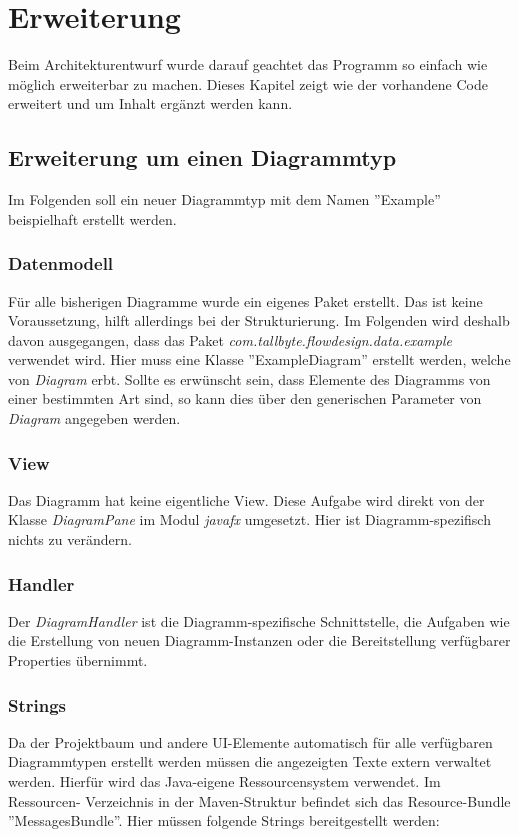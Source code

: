 
\section{Erweiterung}
Beim Architekturentwurf wurde darauf geachtet das Programm so einfach wie möglich erweiterbar zu machen.
Dieses Kapitel zeigt wie der vorhandene Code erweitert und um Inhalt ergänzt werden kann.

\subsection{Erweiterung um einen Diagrammtyp}
Im Folgenden soll ein neuer Diagrammtyp mit dem Namen ''Example'' beispielhaft erstellt werden.

\subsubsection{Datenmodell}
Für alle bisherigen Diagramme wurde ein eigenes Paket erstellt. Das ist keine Voraussetzung, hilft allerdings bei der
Strukturierung. Im Folgenden wird deshalb davon ausgegangen, dass das Paket \textit{com.tallbyte.flowdesign.data.example}
verwendet wird.
Hier muss eine Klasse ''ExampleDiagram'' erstellt werden, welche von \textit{Diagram} erbt. Sollte es erwünscht sein,
dass Elemente des Diagramms von einer bestimmten Art sind, so kann dies über den generischen Parameter von 
\textit{Diagram} angegeben werden.


\subsubsection{View}
Das Diagramm hat keine eigentliche View. Diese Aufgabe wird direkt von der Klasse \textit{DiagramPane} im Modul 
\textit{javafx} umgesetzt. Hier ist Diagramm-spezifisch nichts zu verändern.

\subsubsection{Handler}
Der \textit{DiagramHandler} ist die Diagramm-spezifische Schnittstelle, die Aufgaben wie die Erstellung von neuen
Diagramm-Instanzen oder die Bereitstellung verfügbarer Properties übernimmt.

\subsubsection{Strings}
Da der Projektbaum und andere UI-Elemente automatisch für alle verfügbaren Diagrammtypen erstellt werden müssen
die angezeigten Texte extern verwaltet werden. Hierfür wird das Java-eigene Ressourcensystem verwendet. Im Ressourcen-
Verzeichnis in der Maven-Struktur befindet sich das Resource-Bundle ''MessagesBundle''. Hier müssen folgende Strings
bereitgestellt werden:

